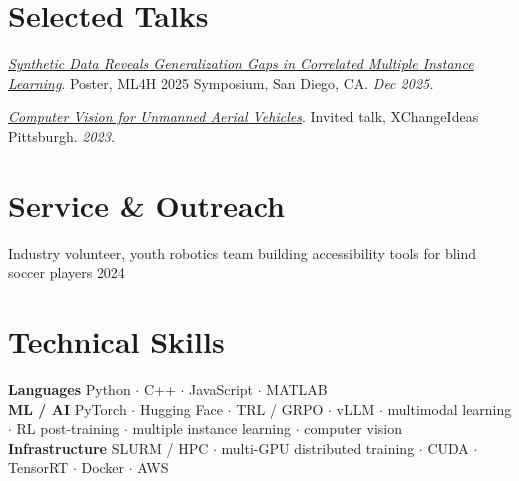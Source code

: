 \documentclass[10pt,letterpaper]{article}
\newcommand{\sansfam}{\sffamily}
\newcommand{\datestamp}[1]{{\sansfam\footnotesize\color{meta}\figureversion{lf}#1}}
\newenvironment{publist}{%
  \begin{list}{}{%
    \setlength{\leftmargin}{1.2em}%
    \setlength{\itemindent}{-1.2em}%
    \setlength{\itemsep}{2pt}%
    \setlength{\parsep}{0pt}%
    \setlength{\topsep}{1pt}%
  }%
}{\end{list}}
\begin{document}
\section{Selected Talks}

\begin{publist}
\item \href{https://drive.google.com/file/d/1Z6lkTsqYSIzOqgM53qONW2riQhVM5R0W/view?usp=sharing}{\textit{Synthetic Data Reveals Generalization Gaps in Correlated Multiple Instance Learning}}. Poster, ML4H 2025 Symposium, San Diego, CA. \textit{Dec 2025.}

\item \href{https://xchangepgh2023.sched.com/event/1LdC7/an-interactive-exploration-of-computer-vision-for-unmanned-aerial-vehicles-uavs}{\textit{Computer Vision for Unmanned Aerial Vehicles}}. Invited talk, XChangeIdeas Pittsburgh. \textit{2023.}
\end{publist}

\section{Service \& Outreach}

Industry volunteer, youth robotics team building accessibility tools for blind soccer players \hfill \datestamp{2024}

\section{Technical Skills}

\noindent\textbf{Languages} \quad Python $\cdot$ C++ $\cdot$ JavaScript $\cdot$ MATLAB \\
\textbf{ML / AI} \quad PyTorch $\cdot$ Hugging Face $\cdot$ TRL / GRPO $\cdot$ vLLM $\cdot$ multimodal learning $\cdot$ RL post-training $\cdot$ multiple instance learning $\cdot$ computer vision \\
\textbf{Infrastructure} \quad SLURM / HPC $\cdot$ multi-GPU distributed training $\cdot$ CUDA $\cdot$ TensorRT $\cdot$ Docker $\cdot$ AWS
\end{document}
